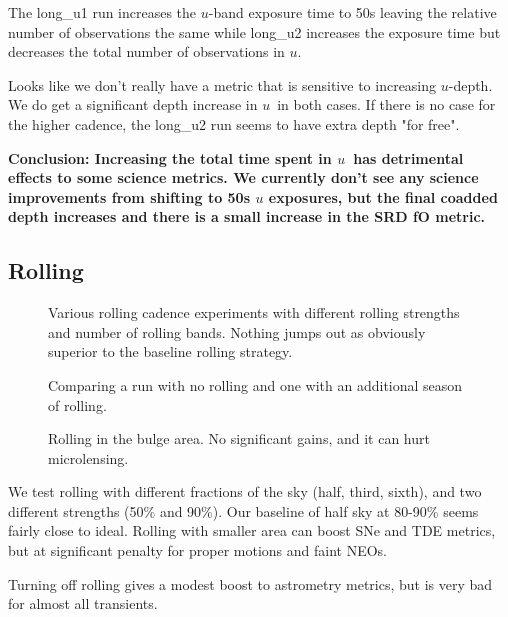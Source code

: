 The long\_u1 run increases the $u$-band exposure time to 50s leaving the relative number of observations the same while long\_u2 increases the exposure time but decreases the total number of observations in $u$. 

Looks like we don't really have a metric that is sensitive to increasing $u$-depth. We do get a significant depth increase in $u$\ in both cases. If there is no case for the higher cadence, the long\_u2 run seems to have extra depth "for free".

{\bf Conclusion:  Increasing the total time spent in $u$\ has detrimental effects to some science metrics. We currently don't see any science improvements from shifting to 50s $u$ exposures, but the final coadded depth increases and there is a small increase in the SRD fO metric.}


\subsection{Rolling}


\begin{figure}
\caption{Various rolling cadence experiments with different rolling strengths and number of rolling bands. Nothing jumps out as obviously superior to the baseline rolling strategy. \label{fig:rolling}}
\end{figure}


\begin{figure}
\caption{Comparing a run with no rolling and one with an additional season of rolling. \label{fig:rolling_more}}
\end{figure}


\begin{figure}
\caption{Rolling in the bulge area. No significant gains, and it can hurt microlensing. \label{fig:rolling_more}}
\end{figure}

We test rolling with different fractions of the sky (half, third, sixth), and two different strengths (50\% and 90\%). 
Our baseline of half sky at 80-90\% seems fairly close to ideal. Rolling with smaller area can boost SNe and TDE metrics, but at significant penalty for proper motions and faint NEOs.

Turning off rolling gives a modest boost to astrometry metrics, but is very bad for almost all transients. 

